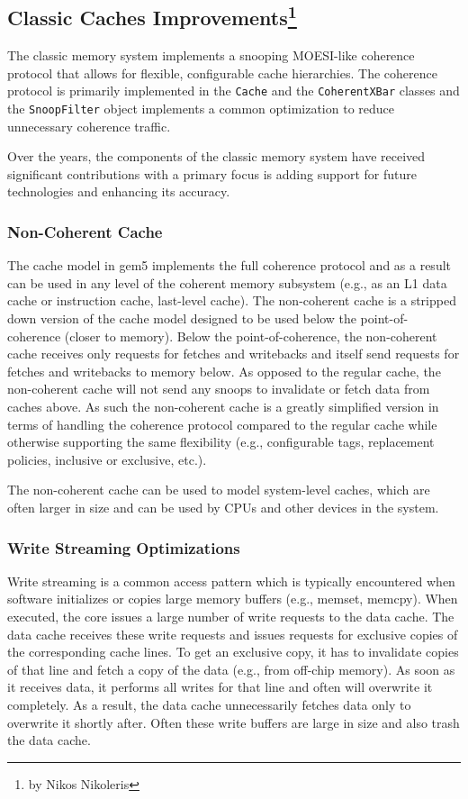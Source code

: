 \subsection[Classic Caches Improvements]{Classic Caches Improvements\footnote{by Nikos Nikoleris}}

The classic memory system implements a snooping MOESI-like coherence protocol that allows for flexible, configurable cache hierarchies.
The coherence protocol is primarily implemented in the \verb|Cache| and the \verb|CoherentXBar| classes and the \verb|SnoopFilter| object implements a common optimization to reduce unnecessary coherence traffic.

Over the years, the components of the classic memory system have received significant contributions with a primary focus is adding support for future technologies and enhancing its accuracy.

\subsubsection[Non-Coherent Cache]{Non-Coherent Cache}
The cache model in gem5 implements the full coherence protocol and as a result can be used in any level of the coherent memory subsystem (e.g., as an L1 data cache or instruction cache, last-level cache).
The non-coherent cache is a stripped down version of the cache model designed to be used below the point-of-coherence (closer to memory).
Below the point-of-coherence, the non-coherent cache receives only requests for fetches and writebacks and itself send requests for fetches and writebacks to memory below.
As opposed to the regular cache, the non-coherent cache will not send any snoops to invalidate or fetch data from caches above.
As such the non-coherent cache is a greatly simplified version in terms of handling the coherence protocol compared to the regular cache while otherwise supporting the same flexibility (e.g., configurable tags, replacement policies, inclusive or exclusive, etc.).

The non-coherent cache can be used to model system-level caches, which are often larger in size and can be used by CPUs and other devices in the system.

\subsubsection[Write Streaming Optimizations]{Write Streaming Optimizations}

Write streaming is a common access pattern which is typically encountered when software initializes or copies large memory buffers (e.g., memset, memcpy).
When executed, the core issues a large number of write requests to the data cache. The data cache receives these write requests and issues requests for exclusive copies of the corresponding cache lines. To get an exclusive copy, it has to invalidate copies of that line and fetch a copy of the data (e.g., from off-chip memory). As soon as it receives data, it performs all writes for that line and often will overwrite it completely. As a result, the data cache unnecessarily fetches data only to overwrite it shortly after. Often these write buffers are large in size and also trash the data cache.

